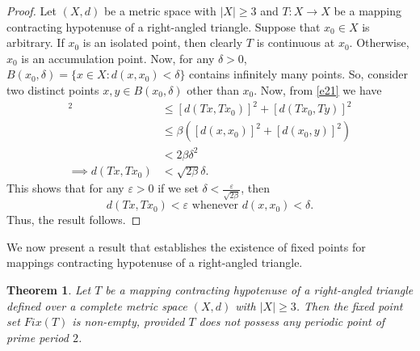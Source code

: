 \documentclass[11pt,reqno,a4paper]{amsart}
\theoremstyle{plain}
\newtheorem{theorem}{Theorem}[section]
\theoremstyle{definition}
\theoremstyle{remark}
\numberwithin{equation}{section}
\begin{document}
\begin{proof}
Let $(X,d)$ be a metric space with $|X|\ge 3$ and $T:X \to X$ be a mapping contracting hypotenuse of a right-angled triangle. Suppose that $x_0 \in X$ is arbitrary. If $x_0$ is an isolated point, then clearly $T$ is continuous at $x_0$. Otherwise, $x_0$ is an accumulation point. Now, for any $\delta>0$, $B(x_0,\delta)=\{x \in X: d(x,x_0)<\delta\}$ contains infinitely many points. So, consider two distinct points $x,y \in B(x_0,\delta)$ other than $x_0$. Now, from \eqref{e21} we have
\begin{align*}
[d(Tx,Tx_0)]^2
&\le [d(Tx,Tx_0)]^2 +[d(Tx_0,Ty)]^2\nonumber\\
&\le \beta\left([d(x,x_0)]^2 +[d(x_0,y)]^2\right)\nonumber\\
& <2\beta \delta^2\nonumber\\
\implies d(Tx,Tx_0) &<\sqrt{2\beta}\delta.
\end{align*}
This shows that for any $\varepsilon>0$ if we set $\delta<\frac{\varepsilon}{\sqrt{2\beta}}$, then 
$$d(Tx,Tx_0)<\varepsilon\text{ whenever }d(x,x_0)<\delta.$$
Thus, the result follows.
\end{proof}
We now present a result that establishes the existence of fixed points for mappings contracting hypotenuse of a right-angled triangle.

\begin{theorem}\label{25}
Let $T$ be a mapping contracting hypotenuse of a right-angled triangle defined over a complete metric space $(X,d)$ with $|X|\ge 3$. Then the fixed point set $Fix(T)$ is non-empty, provided $T$ does not possess any periodic point of prime period $2$.
\end{theorem}
\end{document}
